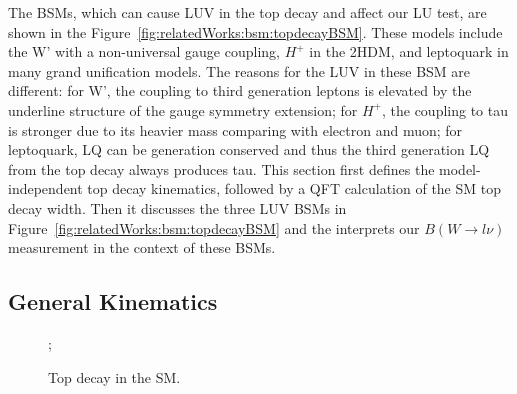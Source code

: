 The BSMs, which can cause LUV in the top decay and affect our LU test, are shown in the Figure~\ref{fig:relatedWorks:bsm:topdecayBSM}. These models include the W' with a non-universal gauge coupling, $H^+$ in the 2HDM, and leptoquark in many grand unification models. The reasons for the LUV in these BSM are different: for W', the coupling to third generation leptons is elevated by the underline structure of the gauge symmetry extension; for $H^+$, the coupling to tau is stronger due to its heavier mass comparing with electron and muon; for leptoquark, LQ can be generation conserved and thus the third generation LQ from the top decay always produces tau. This section first defines the model-independent top decay kinematics, followed by a QFT calculation of the SM top decay width. Then it discusses the three LUV BSMs in Figure~\ref{fig:relatedWorks:bsm:topdecayBSM} and the interprets our $B(W\to l \nu )$ measurement in the context of these BSMs.



\subsection{General Kinematics}
\label{sec:relatedWorks:bsm:kinematics}

\begin{figure}[ht]
    \centering
    ;
    \caption{Top decay in the SM.}
    \label{fig:relatedWorks:bsm:topdecaySM}
\end{figure}

